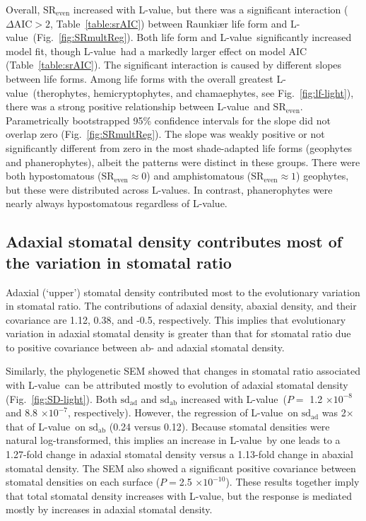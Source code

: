 \documentclass[12pt, oneside]{article}
\newcommand{\el}{L-value}
\begin{document}
Overall, $\mathrm{SR_{even}}$ increased with \el, but there was a significant interaction ($\Delta\mathrm{AIC} > 2$, Table~\ref{table:srAIC}) between Raunki\ae r life form and \el~(Fig.~\ref{fig:SRmultReg}). Both life form and \el~significantly increased model fit, though \el~had a markedly larger effect on model AIC (Table~\ref{table:srAIC}). The significant interaction is caused by different slopes between life forms. Among life forms with the overall greatest \el~(therophytes, hemicryptophytes, and chamaephytes, see Fig.~\ref{fig:lf-light}), there was a strong positive relationship between \el~and $\mathrm{SR_{even}}$. Parametrically bootstrapped 95\% confidence intervals for the slope did not overlap zero (Fig.~\ref{fig:SRmultReg}). The slope was weakly positive or not significantly different from zero in the most shade-adapted life forms (geophytes and phanerophytes), albeit the patterns were distinct in these groups. There were both hypostomatous ($\mathrm{SR_{even}} \approx 0$) and amphistomatous ($\mathrm{SR_{even}} \approx 1$) geophytes, but these were distributed across \el s. In contrast, phanerophytes were nearly always hypostomatous regardless of \el. %

\subsection*{Adaxial stomatal density contributes most of the variation in stomatal ratio}

Adaxial (`upper') stomatal density contributed most to the evolutionary variation in stomatal ratio. The contributions of adaxial density, abaxial density, and their covariance are 1.12, 0.38, and -0.5, respectively. This implies that evolutionary variation in adaxial stomatal density is greater than that for stomatal ratio due to positive covariance between ab- and adaxial stomatal density.

Similarly, the phylogenetic SEM showed that changes in stomatal ratio associated with \el~can be attributed mostly to evolution of adaxial stomatal density (Fig.~\ref{fig:SD-light}). Both $\mathrm{sd_{ad}}$ and $\mathrm{sd_{ab}}$ increased with \el~($P =$ 1.2 $\times10^{-8}$ and 8.8 $\times10^{-7}$, respectively). However, the regression of \el~on $\mathrm{sd_{ad}}$ was 2$\times$ that of \el~on $\mathrm{sd_{ab}}$ (0.24 versus 0.12). Because stomatal densities were natural log-transformed, this implies an increase in \el~by one leads to a 1.27-fold change in adaxial stomatal density versus a 1.13-fold change in abaxial stomatal density. The SEM also showed a significant positive covariance between stomatal densities on each surface ($P = $2.5 $\times10^{-10}$). These results together imply that total stomatal density increases with \el, but the response is mediated mostly by increases in adaxial stomatal density.
\end{document}
